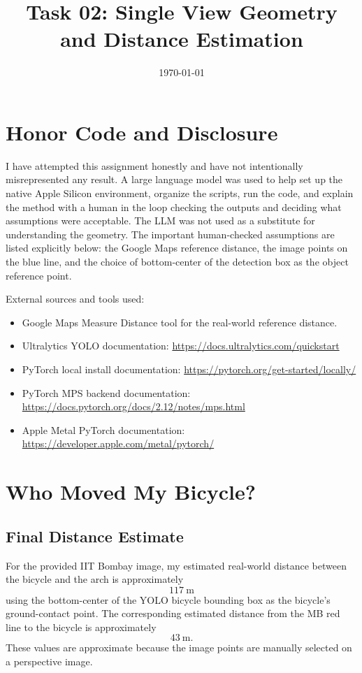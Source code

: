 \documentclass[11pt]{article}
\title{Task 02: Single View Geometry and Distance Estimation}
\author{}
\date{\today}
\begin{document}
\maketitle

\section*{Honor Code and Disclosure}

I have attempted this assignment honestly and have not intentionally misrepresented any result. A large language model was used to help set up the native Apple Silicon environment, organize the scripts, run the code, and explain the method with a human in the loop checking the outputs and deciding what assumptions were acceptable. The LLM was not used as a substitute for understanding the geometry. The important human-checked assumptions are listed explicitly below: the Google Maps reference distance, the image points on the blue line, and the choice of bottom-center of the detection box as the object reference point.

External sources and tools used:
\begin{itemize}
    \item Google Maps Measure Distance tool for the real-world reference distance.
    \item Ultralytics YOLO documentation: \url{https://docs.ultralytics.com/quickstart}
    \item PyTorch local install documentation: \url{https://pytorch.org/get-started/locally/}
    \item PyTorch MPS backend documentation: \url{https://docs.pytorch.org/docs/2.12/notes/mps.html}
    \item Apple Metal PyTorch documentation: \url{https://developer.apple.com/metal/pytorch/}
\end{itemize}

\section{Who Moved My Bicycle?}

\subsection{Final Distance Estimate}

For the provided IIT Bombay image, my estimated real-world distance between the bicycle and the arch is approximately
\[
\boxed{117\ \text{m}}
\]
using the bottom-center of the YOLO bicycle bounding box as the bicycle's ground-contact point. The corresponding estimated distance from the MB red line to the bicycle is approximately
\[
43\ \text{m}.
\]
These values are approximate because the image points are manually selected on a perspective image.
\end{document}

